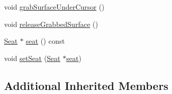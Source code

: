 \begin{DoxyCompactItemize}
\item 
void \hyperlink{classmotorcar_1_1SpatialPointingDevice_ab34f8c2ab699085b5f1d78aecd961614}{grab\-Surface\-Under\-Cursor} ()
\item 
void \hyperlink{classmotorcar_1_1SpatialPointingDevice_a53cd4de170f2f69d95c9d3ee38876060}{release\-Grabbed\-Surface} ()
\item 
\hyperlink{classmotorcar_1_1Seat}{Seat} $\ast$ \hyperlink{classmotorcar_1_1SpatialPointingDevice_ae99e25b875cbdd20f48195cbeedb561f}{seat} () const 
\item 
void \hyperlink{classmotorcar_1_1SpatialPointingDevice_a670901d5510689c6ebb9096c24a75975}{set\-Seat} (\hyperlink{classmotorcar_1_1Seat}{Seat} $\ast$\hyperlink{classmotorcar_1_1SpatialPointingDevice_ae99e25b875cbdd20f48195cbeedb561f}{seat})
\end{DoxyCompactItemize}
\subsection*{Additional Inherited Members}


